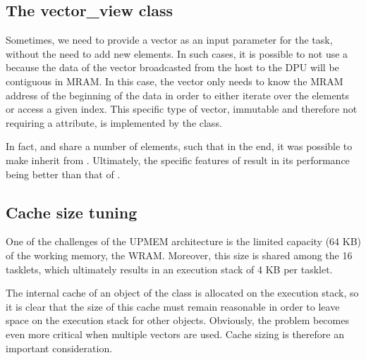 \subsection{The vector\_view class}

Sometimes, we need to provide a vector as an input parameter for the task, without the need to add new elements. 
In such cases, it is possible to not use a  because the data of the vector broadcasted from 
the host to the DPU will be contiguous in MRAM. In this case, the vector only needs to know the MRAM address 
of the beginning of the data in order to either iterate over the elements or access a given index. 
This specific type of vector, immutable and therefore not requiring a  attribute, 
is implemented by the  class.

In fact,  and  share a number of elements, 
such that in the end, it was possible to make  inherit from . 
Ultimately, the specific features of  result in its performance being better than that of .

\subsection{Cache size tuning}
One of the challenges of the UPMEM architecture is the limited capacity (64 KB) of the working memory, the WRAM. 
Moreover, this size is shared among the 16 tasklets, which ultimately results in an execution stack of 4 KB per tasklet. 

The internal cache of an object of the  class is allocated on the execution stack, so it is clear that the size of 
this cache must remain reasonable in order to leave space on the execution stack for other objects. 
Obviously, the problem becomes even more critical when multiple vectors are used. 
Cache sizing is therefore an important consideration.

